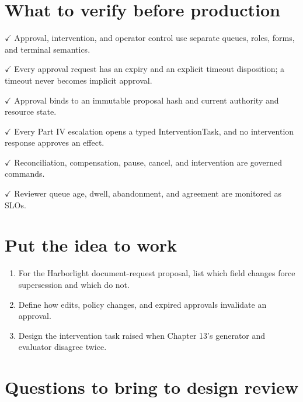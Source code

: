 \section{What to verify before production}

\textbf{\ensuremath{\checkmark}} Approval, intervention, and operator control use separate queues, roles, forms, and terminal semantics.\par

\textbf{\ensuremath{\checkmark}} Every approval request has an expiry and an explicit timeout disposition; a timeout never becomes implicit approval.\par

\textbf{\ensuremath{\checkmark}} Approval binds to an immutable proposal hash and current authority and resource state.\par

\textbf{\ensuremath{\checkmark}} Every Part IV escalation opens a typed InterventionTask, and no intervention response approves an effect.\par

\textbf{\ensuremath{\checkmark}} Reconciliation, compensation, pause, cancel, and intervention are governed commands.\par

\textbf{\ensuremath{\checkmark}} Reviewer queue age, dwell, abandonment, and agreement are monitored as SLOs.\par

\section{Put the idea to work}

\begin{enumerate}

\item For the Harborlight document-request proposal, list which field changes force supersession and which do not.

\item Define how edits, policy changes, and expired approvals invalidate an approval.

\item Design the intervention task raised when Chapter 13's generator and evaluator disagree twice.

\end{enumerate}

\section{Questions to bring to design review}

